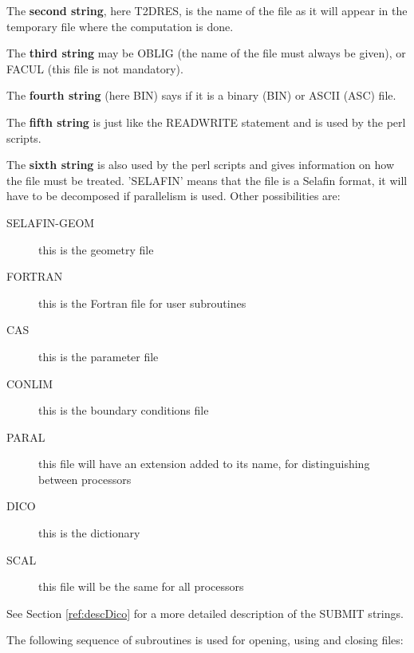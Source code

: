 The \textbf{second string}, here T2DRES, is the name of the file as it will
appear in the temporary file where the computation is done.

The \textbf{third string} may be OBLIG (the name of the file must always be
given), or FACUL (this file is not mandatory).

The \textbf{fourth string} (here BIN) says if it is a binary (BIN) or ASCII
(ASC) file.

The \textbf{fifth string} is just like the READWRITE statement and is used by
the perl scripts.

The \textbf{sixth string} is also used by the perl scripts and gives
information on how the file must be treated. 'SELAFIN' means that the file is a
Selafin format, it will have to be decomposed if parallelism is used. Other
possibilities are:
\begin{description}
  \item [SELAFIN-GEOM] this is the geometry file
  \item [FORTRAN] this is the Fortran file for user subroutines
  \item [CAS] this is the parameter file
  \item [CONLIM] this is the boundary conditions file
  \item [PARAL] this file will have an extension added to its name, for
    distinguishing between processors
  \item [DICO] this is the dictionary
  \item [SCAL] this file will be the same for all processors
\end{description}
See Section \ref{ref:descDico} for a more detailed description of the SUBMIT
strings.

The following sequence of subroutines is used for opening, using and closing
files:

